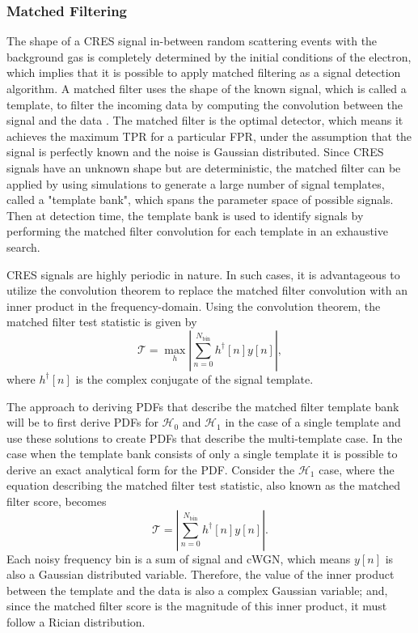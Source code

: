 \subsubsection{Matched Filtering}

The shape of a CRES signal in-between random scattering events with the background gas is completely determined by the initial conditions of the electron, which implies that it is possible to apply matched filtering as a signal detection algorithm. A matched filter uses the shape of the known signal, which is called a template, to filter the incoming data by computing the convolution between the signal and the data \cite{detection_theory}. The matched filter is the optimal detector, which means it achieves the maximum TPR for a particular FPR, under the assumption that the signal is perfectly known and the noise is Gaussian distributed. Since CRES signals have an unknown shape but are deterministic, the matched filter can be applied by using simulations to generate a large number of signal templates, called a "template bank", which spans the parameter space of possible signals. Then at detection time, the template bank is used to identify signals by performing the matched filter convolution for each template in an exhaustive search.

CRES signals are highly periodic in nature. In such cases, it is advantageous to utilize the convolution theorem to replace the matched filter convolution with an inner product in the frequency-domain. Using the convolution theorem, the matched filter test statistic is given by
\begin{equation}
    \mathcal{T}=\max_{h}\left|\sum_{n=0}^{N_\mathrm{bin}}h^\dagger[n]y[n]\right|,
    \label{eq:mf_test_stat}
\end{equation}
where $h^\dagger[n]$ is the complex conjugate of the signal template. 

The approach to deriving PDFs that describe the matched filter template bank will be to first derive PDFs for $\mathcal{H}_0$ and $\mathcal{H}_1$ in the case of a single template and use these solutions to create PDFs that describe the multi-template case. In the case when the template bank consists of only a single template it is possible to derive an exact analytical form for the PDF. Consider the $\mathcal{H}_1$ case, where the equation describing the matched filter test statistic, also known as the matched filter score, becomes
\begin{equation}
    \mathcal{T}=\left|\sum_{n=0}^{N_\mathrm{bin}}h^\dagger[n]y[n]\right|.
    \label{eq:mf_inner_prod_1}
\end{equation}
Each noisy frequency bin is a sum of signal and cWGN, which means $y[n]$ is also a Gaussian distributed variable. Therefore, the value of the inner product between the template and the data is also a complex Gaussian variable; and, since the matched filter score is the magnitude of this inner product, it must follow a Rician distribution. 

